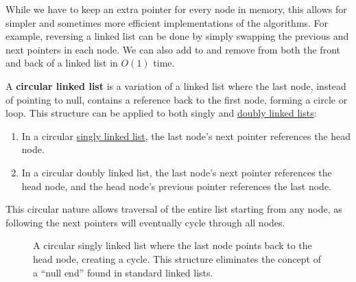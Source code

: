   While we have to keep an extra pointer for every node in memory, this allows for simpler and sometimes more efficient implementations of the algorithms. For example, reversing a linked list can be done by simply swapping the previous and next pointers in each node. We can also add to and remove from both the front and back of a linked list in $O(1)$ time. 

  \begin{definition}
    \label{def:circular-linked-list}
    A \textbf{circular linked list} is a variation of a linked list where the last node, instead of pointing to null, contains a reference back to the first node, forming a circle or loop. This structure can be applied to both singly and \hyperref[def:doubly-linked-list]{doubly linked lists}:
    \begin{enumerate}
      \item In a circular \hyperref[def:singly-linked-list]{singly linked list}, the last node's next pointer references the head node.
      \item In a circular doubly linked list, the last node's next pointer references the head node, and the head node's previous pointer references the last node.
    \end{enumerate}
    This circular nature allows traversal of the entire list starting from any node, as following the next pointers will eventually cycle through all nodes.
    \begin{figure}[H]
      \centering 
      \caption{A circular singly linked list where the last node points back to the head node, creating a cycle. This structure eliminates the concept of a ``null end'' found in standard linked lists.}
      \label{fig:circular_linked_list}
    \end{figure}
  \end{definition}

